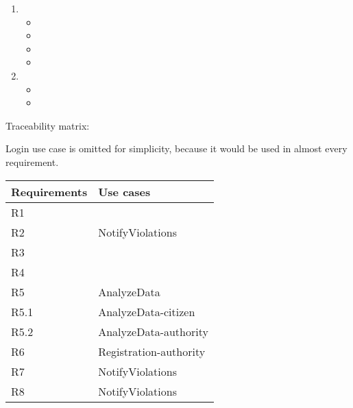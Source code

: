 \begin{enumerate}[label={}]
	\item {}
	\begin{itemize}[label={}]
		\item {}
		\item {}
		\item {}
		\item {}
	\end{itemize}
	\item {}
	\begin{itemize}[label={}]
		\item {}
		\item {}
	\end{itemize} 
\end{enumerate}

\bigskip
Traceability matrix:


Login use case is omitted for simplicity, because it would be used in almost every requirement.


\begin{tabular}{|l|>{\raggedright\arraybackslash}p{8cm}|}
	\hline 
	Requirements & Use cases \\ 
	\hline 
	R1 &  \\ 
	\hline 
	R2 &  NotifyViolations\\ 
	\hline 
	R3 &  \\ 
	\hline 
	R4 &  \\ 
	\hline 
	R5 & AnalyzeData \\ 
	\hline 
	R5.1& AnalyzeData-citizen \\ 
	\hline 
	R5.2& AnalyzeData-authority \\ 
	\hline 
	R6 & Registration-authority \\ 
	\hline 
	R7 & NotifyViolations \\ 
	\hline 
	R8 & NotifyViolations \\ 
	\hline 
\end{tabular} 
